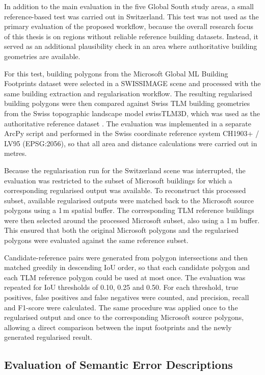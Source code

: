 In addition to the main evaluation in the five Global South study areas, a small reference-based test was carried out in Switzerland. This test was not used as the primary evaluation of the proposed workflow, because the overall research focus of this thesis is on regions without reliable reference building datasets. Instead, it served as an additional plausibility check in an area where authoritative building geometries are available.

For this test, building polygons from the Microsoft Global ML Building Footprints dataset \citep{microsoft_globalmlbuildingfootprints} were selected in a SWISSIMAGE scene \citep{swisstopo_swissimage} and processed with the same building extraction and regularisation workflow. The resulting regularised building polygons were then compared against Swiss TLM building geometries from the Swiss topographic landscape model swissTLM3D, which was used as the authoritative reference dataset \citep{swisstopo_swisstlm3d}. The evaluation was implemented in a separate ArcPy script and performed in the Swiss coordinate reference system CH1903+ / LV95 (EPSG:2056), so that all area and distance calculations were carried out in metres.

Because the regularisation run for the Switzerland scene was interrupted, the evaluation was restricted to the subset of Microsoft buildings for which a corresponding regularised output was available. To reconstruct this processed subset, available regularised outputs were matched back to the Microsoft source polygons using a 1\,m spatial buffer. The corresponding TLM reference buildings were then selected around the processed Microsoft subset, also using a 1\,m buffer. This ensured that both the original Microsoft polygons and the regularised polygons were evaluated against the same reference subset.

Candidate-reference pairs were generated from polygon intersections and then matched greedily in descending IoU order, so that each candidate polygon and each TLM reference polygon could be used at most once. The evaluation was repeated for IoU thresholds of 0.10, 0.25 and 0.50. For each threshold, true positives, false positives and false negatives were counted, and precision, recall and F1-score were calculated. The same procedure was applied once to the regularised output and once to the corresponding Microsoft source polygons, allowing a direct comparison between the input footprints and the newly generated regularised result.

\subsection{Evaluation of Semantic Error Descriptions}
\label{sec:evaluation_semantic_error_descriptions}

